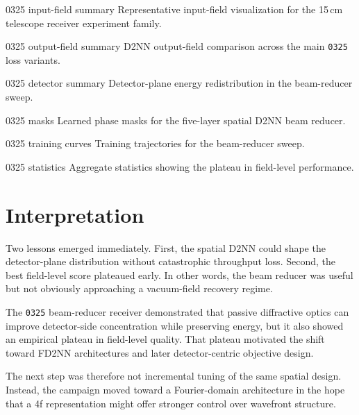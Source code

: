   {0325 input-field summary}
  {Representative input-field visualization for the 15\,cm telescope receiver
  experiment family.}

  {0325 output-field summary}
  {D2NN output-field comparison across the main \texttt{0325} loss variants.}

  {0325 detector summary}
  {Detector-plane energy redistribution in the beam-reducer sweep.}

  {0325 masks}
  {Learned phase masks for the five-layer spatial D2NN beam reducer.}

  {0325 training curves}
  {Training trajectories for the beam-reducer sweep.}

  {0325 statistics}
  {Aggregate statistics showing the plateau in field-level performance.}

\section{Interpretation}

Two lessons emerged immediately. First, the spatial D2NN could shape the
detector-plane distribution without catastrophic throughput loss. Second, the
best field-level score plateaued early. In other words, the beam reducer was
useful but not obviously approaching a vacuum-field recovery regime.

\begin{discovery}
The \texttt{0325} beam-reducer receiver demonstrated that passive diffractive optics
can improve detector-side concentration while preserving energy, but it also
showed an empirical plateau in field-level quality. That plateau motivated the
shift toward FD2NN architectures and later detector-centric objective design.
\end{discovery}

The next step was therefore not incremental tuning of the same spatial design.
Instead, the campaign moved toward a Fourier-domain architecture in the hope
that a 4f representation might offer stronger control over wavefront structure.
